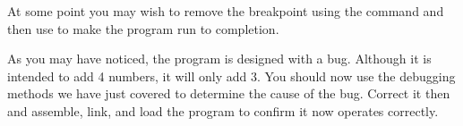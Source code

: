 At some point you may wish to remove the breakpoint using the
 command and then use  to make the program run to
completion.

As you may have noticed, the program is designed with a bug. Although
it is intended to add 4 numbers, it will only add 3. You should now use
the debugging methods we have just covered to determine the cause of the
bug. Correct it then and assemble, link, and load the program to confirm
it now operates correctly.
